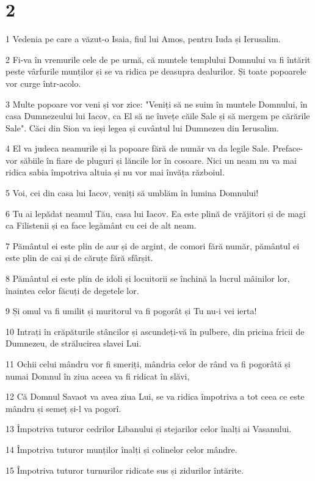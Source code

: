 \chapter{2}

\par 1 Vedenia pe care a văzut-o Isaia, fiul lui Amos, pentru Iuda și Ierusalim.
\par 2 Fi-va în vremurile cele de pe urmă, că muntele templului Domnului va fi întărit peste vârfurile munților și se va ridica pe deasupra dealurilor. Și toate popoarele vor curge într-acolo.
\par 3 Multe popoare vor veni și vor zice: "Veniți să ne suim în muntele Domnului, în casa Dumnezeului lui Iacov, ca El să ne învețe căile Sale și să mergem pe cărările Sale". Căci din Sion va ieși legea și cuvântul lui Dumnezeu din Ierusalim.
\par 4 El va judeca neamurile și la popoare fără de număr va da legile Sale. Preface-vor săbiile în fiare de pluguri și lăncile lor în cosoare. Nici un neam nu va mai ridica sabia împotriva altuia și nu vor mai învăța războiul.
\par 5 Voi, cei din casa lui Iacov, veniți să umblăm în lumina Domnului!
\par 6 Tu ai lepădat neamul Tău, casa lui Iacov. Ea este plină de vrăjitori și de magi ca Filistenii și ea face legământ cu cei de alt neam.
\par 7 Pământul ei este plin de aur și de argint, de comori fără număr, pământul ei este plin de cai și de căruțe fără sfârșit.
\par 8 Pământul ei este plin de idoli și locuitorii se închină la lucrul mâinilor lor, înaintea celor făcuți de degetele lor.
\par 9 Și omul va fi umilit și muritorul va fi pogorât și Tu nu-i vei ierta!
\par 10 Intrați în crăpăturile stâncilor și ascundeți-vă în pulbere, din pricina fricii de Dumnezeu, de strălucirea slavei Lui.
\par 11 Ochii celui mândru vor fi smeriți, mândria celor de rând va fi pogorâtă și numai Domnul în ziua aceea va fi ridicat în slăvi,
\par 12 Că Domnul Savaot va avea ziua Lui, se va ridica împotriva a tot ceea ce este mândru și semeț și-l va pogorî.
\par 13 Împotriva tuturor cedrilor Libanului și stejarilor celor înalți ai Vasanului.
\par 14 Împotriva tuturor munților înalți și colinelor celor mândre.
\par 15 Împotriva tuturor turnurilor ridicate sus și zidurilor întărite.
